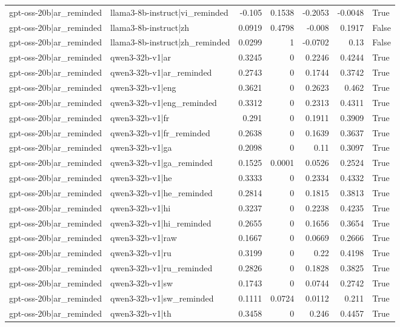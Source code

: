 \begin{table}
\begin{tabular}{l l r r r r l}
gpt-oss-20b|ar_reminded & llama3-8b-instruct|vi_reminded & -0.105 & 0.1538 & -0.2053 & -0.0048 & True \\
gpt-oss-20b|ar_reminded & llama3-8b-instruct|zh & 0.0919 & 0.4798 & -0.008 & 0.1917 & False \\
gpt-oss-20b|ar_reminded & llama3-8b-instruct|zh_reminded & 0.0299 & 1 & -0.0702 & 0.13 & False \\
gpt-oss-20b|ar_reminded & qwen3-32b-v1|ar & 0.3245 & 0 & 0.2246 & 0.4244 & True \\
gpt-oss-20b|ar_reminded & qwen3-32b-v1|ar_reminded & 0.2743 & 0 & 0.1744 & 0.3742 & True \\
gpt-oss-20b|ar_reminded & qwen3-32b-v1|eng & 0.3621 & 0 & 0.2623 & 0.462 & True \\
gpt-oss-20b|ar_reminded & qwen3-32b-v1|eng_reminded & 0.3312 & 0 & 0.2313 & 0.4311 & True \\
gpt-oss-20b|ar_reminded & qwen3-32b-v1|fr & 0.291 & 0 & 0.1911 & 0.3909 & True \\
gpt-oss-20b|ar_reminded & qwen3-32b-v1|fr_reminded & 0.2638 & 0 & 0.1639 & 0.3637 & True \\
gpt-oss-20b|ar_reminded & qwen3-32b-v1|ga & 0.2098 & 0 & 0.11 & 0.3097 & True \\
gpt-oss-20b|ar_reminded & qwen3-32b-v1|ga_reminded & 0.1525 & 0.0001 & 0.0526 & 0.2524 & True \\
gpt-oss-20b|ar_reminded & qwen3-32b-v1|he & 0.3333 & 0 & 0.2334 & 0.4332 & True \\
gpt-oss-20b|ar_reminded & qwen3-32b-v1|he_reminded & 0.2814 & 0 & 0.1815 & 0.3813 & True \\
gpt-oss-20b|ar_reminded & qwen3-32b-v1|hi & 0.3237 & 0 & 0.2238 & 0.4235 & True \\
gpt-oss-20b|ar_reminded & qwen3-32b-v1|hi_reminded & 0.2655 & 0 & 0.1656 & 0.3654 & True \\
gpt-oss-20b|ar_reminded & qwen3-32b-v1|raw & 0.1667 & 0 & 0.0669 & 0.2666 & True \\
gpt-oss-20b|ar_reminded & qwen3-32b-v1|ru & 0.3199 & 0 & 0.22 & 0.4198 & True \\
gpt-oss-20b|ar_reminded & qwen3-32b-v1|ru_reminded & 0.2826 & 0 & 0.1828 & 0.3825 & True \\
gpt-oss-20b|ar_reminded & qwen3-32b-v1|sw & 0.1743 & 0 & 0.0744 & 0.2742 & True \\
gpt-oss-20b|ar_reminded & qwen3-32b-v1|sw_reminded & 0.1111 & 0.0724 & 0.0112 & 0.211 & True \\
gpt-oss-20b|ar_reminded & qwen3-32b-v1|th & 0.3458 & 0 & 0.246 & 0.4457 & True \\

\end{tabular}
\end{table}
